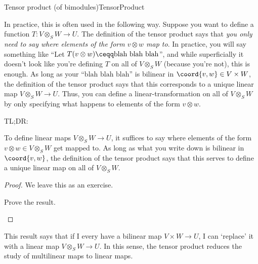 \begin{thm}{Tensor product (of bimodules)}{TensorProduct}
\begin{rmk}
		In practice, this is often used in the following way.  Suppose you want to define a function $T\colon V\otimes _SW\rightarrow U$.  The definition of the tensor product says that \emph{you only need to say where elements of the form $v\otimes w$ map to}.  In practice, you will say something like ``Let $T(v\otimes w)\ceqq \text{blah blah blah}$\textellipsis'', and while superficially it doesn't look like you're defining $T$ on all of $V\otimes _SW$ (because you're not), this is enough.  As long as your ``$\text{blah blah blah}$'' is bilinear in $\coord{v,w}\in V\times W$, the definition of the tensor product says that this corresponds to a unique linear map $V\otimes _SW\rightarrow U$.  Thus, you can define a linear-transformation on all of $V\otimes _SW$ by only specifying what happens to elements of the form $v\otimes w$.
		
		TL;DR:
		\begin{important}
			To define linear maps $V\otimes _SW\rightarrow U$, it suffices to say where elements of the form $v\otimes w\in V\otimes _SW$ get mapped to.  As long as what you write down is bilinear in $\coord{v,w}$, the definition of the tensor product says that this serves to define a unique linear map on all of $V\otimes _SW$.
		\end{important}
	\end{rmk}
	\begin{proof}
		We leave this as an exercise.
		\begin{exr}[breakable=false]{}{}
			Prove the result.
		\end{exr}
	\end{proof}
\end{thm}
This result says that if I every have a bilinear map $V\times W\rightarrow U$, I can `replace' it with a linear map $V\otimes _SW\rightarrow U$.  In this sense, the tensor product reduces the study of multilinear maps to linear maps.


